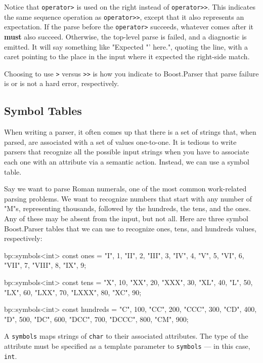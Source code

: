Notice that \texttt{operator>} is used on the right instead of \texttt{operator>>}. This indicates the same sequence operation as \texttt{operator>>}, except that it also represents an expectation. If the parse before the \texttt{operator>} succeeds, whatever comes after it \textbf{must} also succeed. Otherwise, the top-level parse is failed, and a diagnostic is emitted. It will say something like "Expected \textquotesingle"' here.", quoting the line, with a caret pointing to the place in the input where it expected the right-side match.

Choosing to use \texttt{>} versus \texttt{>>} is how you indicate to Boost.Parser that parse failure is or is not a hard error, respectively.

\subsection{Symbol Tables}

When writing a parser, it often comes up that there is a set of strings that, when parsed, are associated with a set of values one-to-one. It is tedious to write parsers that recognize all the possible input strings when you have to associate each one with an attribute via a semantic action. Instead, we can use a symbol table.

Say we want to parse Roman numerals, one of the most common work-related parsing problems. We want to recognize numbers that start with any number of "M"s, representing thousands, followed by the hundreds, the tens, and the ones. Any of these may be absent from the input, but not all. Here are three symbol Boost.Parser tables that we can use to recognize ones, tens, and hundreds values, respectively:

\begin{code}
bp::symbols<int> const ones = {
    {"I", 1},
    {"II", 2},
    {"III", 3},
    {"IV", 4},
    {"V", 5},
    {"VI", 6},
    {"VII", 7},
    {"VIII", 8},
    {"IX", 9}};

bp::symbols<int> const tens = {
    {"X", 10},
    {"XX", 20},
    {"XXX", 30},
    {"XL", 40},
    {"L", 50},
    {"LX", 60},
    {"LXX", 70},
    {"LXXX", 80},
    {"XC", 90}};

bp::symbols<int> const hundreds = {
    {"C", 100},
    {"CC", 200},
    {"CCC", 300},
    {"CD", 400},
    {"D", 500},
    {"DC", 600},
    {"DCC", 700},
    {"DCCC", 800},
    {"CM", 900}};
\end{code}

A \texttt{symbols} maps strings of \texttt{char} to their associated attributes. The type of the attribute must be specified as a template parameter to \texttt{symbols} --- in this case, \texttt{int}.

